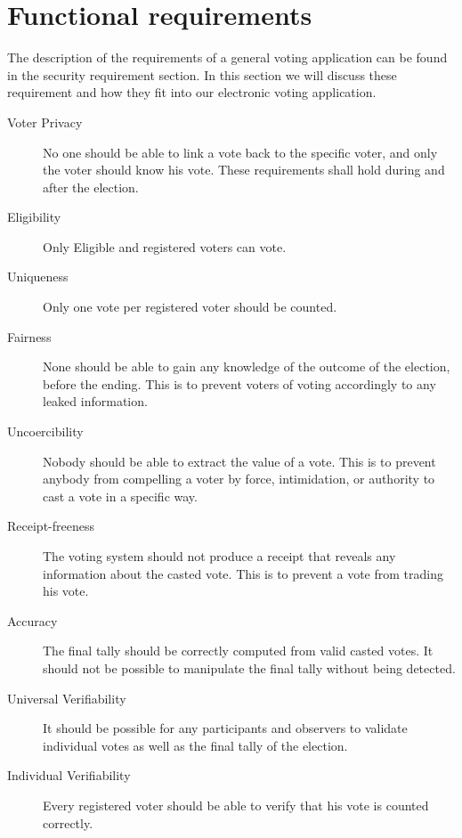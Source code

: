 \section{Functional requirements}
The description of the requirements of a general voting application can be found in the security requirement section. In this section we will discuss these requirement and how they fit into our electronic voting application.





\begin{description}
    \item [Voter Privacy]
        No one should be able to link a vote back to the specific voter, and only the voter should
        know his vote. These requirements shall hold during and after the election.  
    
    \item [Eligibility]    
        Only Eligible and registered voters can vote. 
    
    \item [Uniqueness]
        Only one vote per registered voter should be counted.
    
    \item [Fairness]
        None should be able to gain any knowledge of the outcome of the election, before the ending. This is to prevent voters of voting accordingly to any leaked information. 
    
    \item [Uncoercibility]
        Nobody should be able to extract the value of a vote. This is to prevent anybody from compelling a voter by force, intimidation, or authority to cast a vote in a specific way. 
    
    \item [Receipt-freeness] 
        The voting system should not produce a receipt that reveals any information about the casted vote. This is to prevent a vote from trading his vote. 
    
    \item [Accuracy] 
        The final tally should be correctly computed from valid casted votes. It should not be
        possible to manipulate the final tally without being detected. 
    
    \item [Universal Verifiability]
        It should be possible for any participants and observers to validate individual votes as well as the final tally of the election. 
    
    \item [Individual Verifiability]    
        Every registered voter should be able to verify that his vote is counted correctly. 
    
\end{description}
